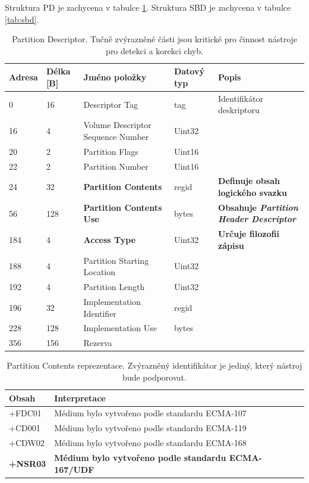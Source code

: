 Struktura PD je zachycena v tabulce \ref{tab:pd}. Struktura SBD je zachycena v tabulce \ref{tab:sbd}. 
\begin{table}[]
    \centering
    \begin{tabular}{ | l | l | p{4.2cm} | p{1.8cm} | p{5.5cm} | }
        \hline
        Adresa  & Délka [B]   & Jméno položky & Datový typ    & Popis \\ \hline\hline
        0   &16     & Descriptor Tag                    & tag           & Identifikátor deskriptoru \\ \hline
        16  &4      &Volume Descriptor Sequence Number  & Uint32        & \\ \hline
        20  &2      &Partition Flags                    & Uint16        & \\ \hline
        22  &2      &Partition Number                   & Uint16        & \\ \hline
        24  &32     &\textbf{Partition Contents}        & regid         & \textbf{Definuje obsah logického svazku} \\ \hline
        56  &128    &\textbf{Partition Contents Use}    & bytes         & \textbf{Obsahuje \textit{Partition Header Descriptor}} \\ \hline
        184 &4      &\textbf{Access Type}               & Uint32        & \textbf{Určuje filozofii zápisu} \\ \hline
        188 &4      &Partition Starting Location        & Uint32        & \\ \hline
        192 &4      &Partition Length                   & Uint32        & \\ \hline
        196 &32     &Implementation Identifier          & regid         & \\ \hline
        228 &128    &Implementation Use                 & bytes         & \\ \hline
        356 &156    &Rezerva                            &               & \\ \hline 
    \end{tabular}
    \caption{Partition Descriptor. Tučně zvýrazněné části jsou kritické pro činnost nástroje pro detekci a korekci chyb.\label{tab:pd}}
\end{table}
\begin{table}
    \centering
    \begin{tabular}{| l | l |}
        \hline
        Obsah & Interpretace \\ \hline\hline
        +FDC01& Médium bylo vytvořeno podle standardu ECMA-107 \\ \hline
        +CD001& Médium bylo vytvořeno podle standardu ECMA-119\\ \hline
        +CDW02& Médium bylo vytvořeno podle standardu ECMA-168\\ \hline
        \textbf{+NSR03}& \textbf{Médium bylo vytvořeno podle standardu ECMA-167/UDF}\\ \hline
    \end{tabular}
    \caption{Partition Contents reprezentace. Zvýrazněný identifikátor je jediný, který nástroj bude podporovat.\label{tab:pd-partition-contents}}
\end{table}
